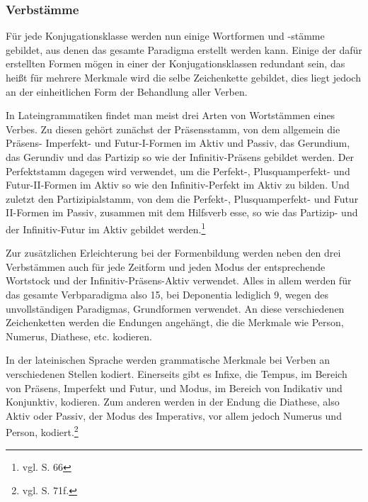 \subsubsection{Verbstämme}
Für jede Konjugationsklasse werden nun einige Wortformen und -stämme gebildet, aus denen das gesamte Paradigma erstellt werden kann. Einige der dafür erstellten Formen mögen in einer der Konjugationsklassen redundant sein, das heißt für mehrere Merkmale wird die selbe Zeichenkette gebildet, dies liegt jedoch an der einheitlichen Form der Behandlung aller Verben. \par
In Lateingrammatiken findet man meist drei Arten von Wortstämmen eines Verbes. Zu diesen gehört zunächst der Präsensstamm, von dem allgemein die Präsens- Imperfekt- und Futur-I-Formen im Aktiv und Passiv, das Gerundium, das Gerundiv und das Partizip so wie der Infinitiv-Präsens gebildet werden. Der Perfektstamm dagegen wird verwendet, um die Perfekt-, Plusquamperfekt- und Futur-II-Formen im Aktiv so wie den Infinitiv-Perfekt im Aktiv zu bilden. Und zuletzt den Partizipialstamm, von dem die Perfekt-, Plusquamperfekt- und Futur II-Formen im Passiv, zusammen mit dem Hilfsverb esse, so wie das Partizip- und der Infinitiv-Futur im Aktiv gebildet werden.\footnote{vgl. \cite{BAYER-LINDAUER1994} S. 66} \par
Zur zusätzlichen Erleichterung bei der Formenbildung werden neben den drei Verbstämmen auch für jede Zeitform und jeden Modus der entsprechende Wort\-stock und der Infinitiv-Präsens-Aktiv verwendet. Alles in allem werden für das gesamte Verbparadigma also 15, bei Deponentia lediglich 9, wegen des unvollständigen Paradigmas, Grundformen verwendet. An diese verschiedenen Zeichenketten werden die Endungen angehängt, die die Merkmale wie Person, Numerus, Diathese, etc. kodieren. \par
In der lateinischen Sprache werden grammatische Merkmale bei Verben an verschiedenen Stellen kodiert. Einerseits gibt es Infixe, die Tempus, im Bereich von Präsens, Imperfekt und Futur, und Modus, im Bereich von Indikativ und Konjunktiv, kodieren. Zum anderen werden in der Endung die Diathese, also Aktiv oder Passiv, der Modus des Imperativs, vor allem jedoch Numerus und Person, kodiert.\footnote{vgl. \cite{BAYER-LINDAUER1994} S. 71f.} \par
